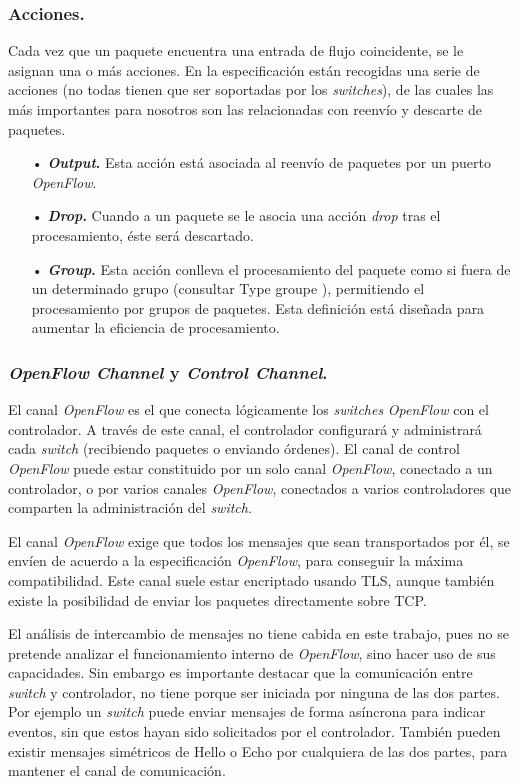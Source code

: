 \documentclass[a4paper,11pt]{book}
\begin{document}
\subsubsection{Acciones.} Cada vez que un paquete encuentra una entrada de flujo coincidente, se le asignan una o más acciones. En la especificación están recogidas una serie de acciones (no todas tienen que ser soportadas por los \textit{switches}), de las cuales las más importantes para nosotros son las relacionadas con reenvío y descarte de paquetes.

\begin{itemize}
\item[•] \textbf{\textit{Output}.} Esta acción está asociada al reenvío de paquetes por un puerto \emph{OpenFlow}.
\item[•] \textbf{\textit{Drop}.} Cuando a un paquete se le asocia una acción \textit{drop} tras el procesamiento, éste será descartado.
\item[•] \textbf{\textit{Group}.} Esta acción conlleva el procesamiento del paquete como si fuera de un determinado grupo (consultar Type groupe \cite{openflow13}), permitiendo el procesamiento por grupos de paquetes. Esta definición está diseñada para aumentar la eficiencia de procesamiento.
\end{itemize}

\subsubsection{\textit{OpenFlow Channel} y \textit{Control Channel}.} El canal \emph{OpenFlow} es el que conecta lógicamente los \textit{switches} \emph{OpenFlow} con el controlador. A través de este canal, el controlador configurará y administrará cada \textit{switch} (recibiendo paquetes o enviando órdenes). El canal de control \emph{OpenFlow} puede estar constituido por un solo canal \emph{OpenFlow}, conectado a un controlador, o por varios canales \emph{OpenFlow}, conectados a varios controladores que comparten la administración del \textit{switch}. 

El canal \emph{OpenFlow} exige que todos los mensajes que sean transportados por él, se envíen de acuerdo a la especificación \emph{OpenFlow}, para conseguir la máxima compatibilidad. Este canal suele estar encriptado usando \ac{TLS}, aunque también existe la posibilidad de enviar los paquetes directamente sobre TCP.

El análisis de intercambio de mensajes no tiene cabida en este trabajo, pues no se pretende analizar el funcionamiento interno de \emph{OpenFlow}, sino hacer uso de sus capacidades. Sin embargo es importante destacar que la comunicación entre \textit{switch} y controlador, no tiene porque ser iniciada por ninguna de las dos partes. Por ejemplo un \textit{switch} puede enviar mensajes de forma asíncrona para indicar eventos, sin que estos hayan sido solicitados por el controlador. También pueden existir mensajes simétricos de Hello o Echo por cualquiera de las dos partes, para mantener el canal de comunicación.
\end{document}

